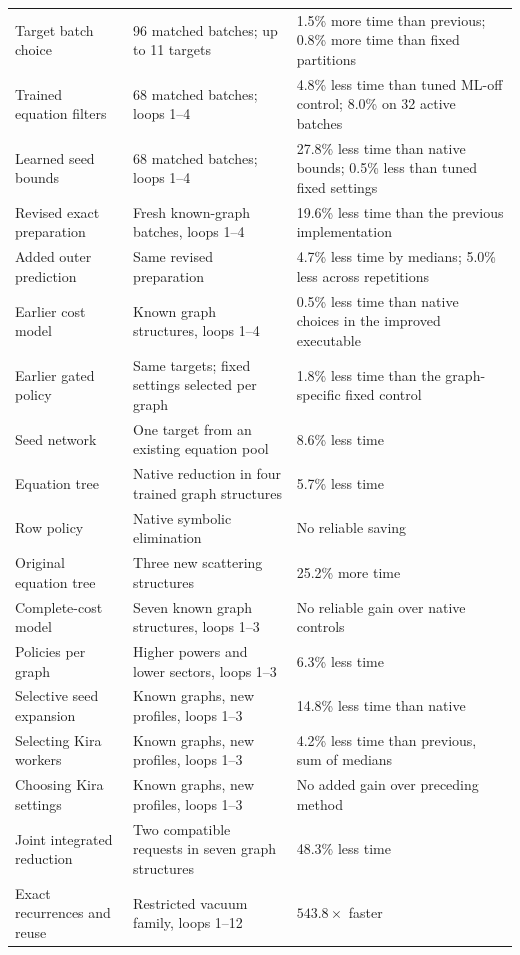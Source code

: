 \begin{table}[!htbp]
\begin{tabularx}{\linewidth}{@{}lYY@{}}
Target batch choice & 96 matched batches; up to 11 targets & 1.5\% more time than previous; 0.8\% more time than fixed partitions\\
Trained equation filters & 68 matched batches; loops 1--4 & 4.8\% less time than tuned ML-off control; 8.0\% on 32 active batches\\
Learned seed bounds & 68 matched batches; loops 1--4 & 27.8\% less time than native bounds; 0.5\% less than tuned fixed settings\\
Revised exact preparation & Fresh known-graph batches, loops 1--4 & 19.6\% less time than the previous implementation\\
Added outer prediction & Same revised preparation & 4.7\% less time by medians; 5.0\% less across repetitions\\
Earlier cost model & Known graph structures, loops 1--4 & 0.5\% less time than native choices in the improved executable\\
Earlier gated policy & Same targets; fixed settings selected per graph & 1.8\% less time than the graph-specific fixed control\\
Seed network & One target from an existing equation pool & 8.6\% less time\\
Equation tree & Native reduction in four trained graph structures & 5.7\% less time\\
Row policy & Native symbolic elimination & No reliable saving\\
Original equation tree & Three new scattering structures & 25.2\% more time\\
Complete-cost model & Seven known graph structures, loops 1--3 & No reliable gain over native controls\\
Policies per graph & Higher powers and lower sectors, loops 1--3 & 6.3\% less time\\
Selective seed expansion & Known graphs, new profiles, loops 1--3 & 14.8\% less time than native\\
Selecting Kira workers & Known graphs, new profiles, loops 1--3 & 4.2\% less time than previous, sum of medians\\
Choosing Kira settings & Known graphs, new profiles, loops 1--3 & No added gain over preceding method\\
Joint integrated reduction & Two compatible requests in seven graph structures & 48.3\% less time\\
Exact recurrences and reuse & Restricted vacuum family, loops 1--12 & $543.8\times$ faster\\\bottomrule
\end{tabularx}
\end{table}

